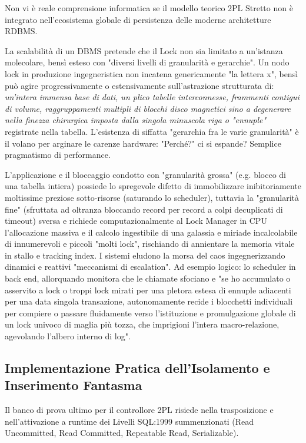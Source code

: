 Non vi è reale comprensione informatica se il modello teorico 2PL Stretto non è integrato nell'ecosistema globale di persistenza delle moderne architetture RDBMS.

La scalabilità di un DBMS pretende che il Lock non sia limitato a un'istanza molecolare, bensì esteso con "diversi livelli di granularità e gerarchie". Un nodo lock in produzione ingegneristica non incatena genericamente "la lettera x", bensì può agire progressivamente o estensivamente sull'astrazione strutturata di: \textit{un'intera immensa base di dati, un plico tabelle interconnesse, frammenti contigui di volume, raggruppamenti multipli di blocchi disco magnetici sino a degenerare nella finezza chirurgica imposta dalla singola minuscola riga o "ennuple"} registrate nella tabella. L'esistenza di siffatta "gerarchia fra le varie granularità" è il volano per arginare le carenze hardware: "Perché?" ci si espande? Semplice pragmatismo di performance.

L'applicazione e il bloccaggio condotto con "granularità grossa" (e.g. blocco di una tabella intiera) possiede lo spregevole difetto di immobilizzare inibitoriamente moltissime preziose sotto-risorse (saturando lo scheduler), tuttavia la "granularità fine" (sfruttata ad oltranza bloccando record per record a colpi decuplicati di timeout) sversa e richiede computazionalmente al Lock Manager in CPU l'allocazione massiva e il calcolo ingestibile di una galassia e miriade incalcolabile di innumerevoli e piccoli "molti lock", rischiando di annientare la memoria vitale in stallo e tracking index.
I sistemi eludono la morsa del caos ingegnerizzando dinamici e reattivi "meccanismi di escalation". Ad esempio logico: lo scheduler in back end, allorquando monitora che le chiamate sfociano e "se ho accumulato o asservito a lock o troppi lock mirati per una pletora estesa di ennuple adiacenti per una data singola transazione, autonomamente recide i blocchetti individuali per compiere o passare fluidamente verso l'istituzione e promulgazione globale di un lock univoco di maglia più tozza, che imprigioni l'intera macro-relazione, agevolando l'albero interno di log".

\subsection{Implementazione Pratica dell'Isolamento e Inserimento Fantasma}
Il banco di prova ultimo per il controllore 2PL risiede nella trasposizione e nell'attivazione a runtime dei Livelli SQL:1999 summenzionati (Read Uncommitted, Read Committed, Repeatable Read, Serializable).

